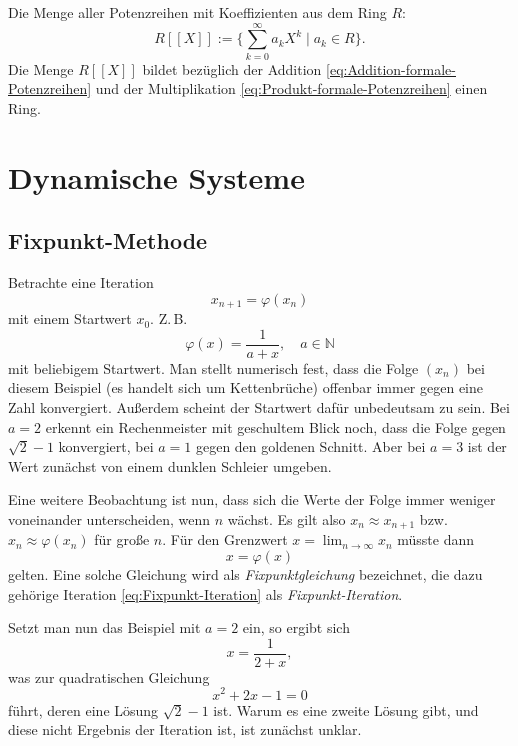 \documentclass[a4paper,11pt,fleqn,twoside]{scrartcl}
\numberwithin{equation}{section}
\newcommand{\N}{\mathbb N}
\begin{document}
Die Menge aller Potenzreihen mit Koeffizienten aus dem Ring $R$:
\begin{equation}\textstyle
R[[X]] := \{\sum_{k=0}^\infty a_k X^k\mid a_k\in R\}.
\end{equation}
Die Menge $R[[X]]$ bildet bezüglich der Addition
\eqref{eq:Addition-formale-Potenzreihen} und der Multiplikation
\eqref{eq:Produkt-formale-Potenzreihen}
einen Ring.

\section{Dynamische Systeme}
\subsection{Fixpunkt-Methode}
Betrachte eine Iteration
\begin{equation}\label{eq:Fixpunkt-Iteration}
x_{n+1}=\varphi(x_n)
\end{equation}
mit einem Startwert $x_0$. Z.\,B.
\begin{equation}
\varphi(x) = \frac{1}{a+x},\quad a\in\N
\end{equation}
mit beliebigem Startwert. Man stellt numerisch fest, dass die
Folge $(x_n)$ bei diesem Beispiel (es handelt sich um Kettenbrüche)
offenbar immer gegen eine Zahl konvergiert. Außerdem
scheint der Startwert dafür unbedeutsam zu sein. Bei $a=2$ erkennt
ein Rechenmeister mit geschultem Blick noch, dass die Folge
gegen $\sqrt{2}-1$ konvergiert, bei $a=1$ gegen den goldenen Schnitt.
Aber bei $a=3$ ist der Wert zunächst von einem dunklen Schleier
umgeben.

Eine weitere Beobachtung ist nun, dass sich die Werte der Folge
immer weniger voneinander unterscheiden, wenn $n$ wächst.
Es gilt also $x_n\approx x_{n+1}$ bzw. $x_n\approx \varphi(x_n)$
für große $n$. Für den Grenzwert $x=\lim_{n\to\infty} x_n$ müsste
dann
\begin{equation}
x = \varphi(x)
\end{equation}
gelten. Eine solche Gleichung wird als \emph{Fixpunktgleichung}
bezeichnet, die dazu gehörige Iteration \eqref{eq:Fixpunkt-Iteration}
als \emph{Fixpunkt-Iteration}.

Setzt man nun das Beispiel mit $a=2$ ein, so ergibt
sich
\begin{equation}
x = \frac{1}{2+x},
\end{equation}
was zur quadratischen Gleichung
\begin{equation}
x^2+2x-1 = 0
\end{equation}
führt, deren eine Lösung $\sqrt{2}-1$ ist. Warum es eine zweite
Lösung gibt, und diese nicht Ergebnis der Iteration ist, ist
zunächst unklar.
\end{document}
